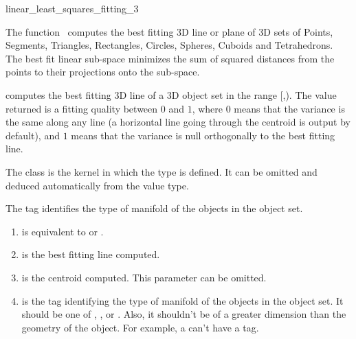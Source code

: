 
\begin{ccRefFunction}{linear_least_squares_fitting_3}  

\ccDefinition
  
The function \ccRefName\ computes the best fitting 3D line or plane of 3D
sets of Points, Segments, Triangles, Rectangles, Circles, Spheres, Cuboids and Tetrahedrons. The best fit linear sub-space minimizes
the sum of squared distances from the points to their projections onto the
sub-space.


{ computes the best fitting 3D line of a 3D object set in the range
[,). The value returned is a fitting quality
between $0$ and $1$, where $0$ means that the variance is the same
along any line (a horizontal line going through the centroid is output
by default), and $1$ means that the variance is null orthogonally
to the best fitting line. }

The class  is the kernel in which the type
 is defined. It can be omitted and
deduced automatically from the value type.

The tag  identifies the type of manifold of the objects in the object set.


\begin{enumerate}
   \item  {} is equivalent to  or .
   \item  {} is the best fitting line computed.
   \item  {} is the centroid computed. This parameter can be
          omitted.
   \item  {} is the tag identifying the type of manifold of the objects in the object set. It should be one of , ,  or . Also, it shouldn't be of a greater dimension than the geometry of the object. For example, a  can't have a  tag.
\end{enumerate}



\end{ccRefFunction}
